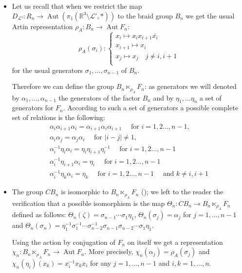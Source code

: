 \documentclass[11pt]{amsart}
\begin{document}
\begin{itemize}
  \item 
  Let us recall that when we restrict the map $D_{\mathcal{L}'}:R_n \to {\mathop{\mathrm{Aut}}\nolimits}(\pi_1({\mathbb{R}}^3 \setminus \mathcal{L}',*))$ to the braid group $B_n$
we get the usual Artin representation $\rho_A : B_n \to {\mathop{\mathrm{Aut}}\nolimits} F_n$:
$$\rho_A(\sigma_i) : 
\left\{\begin{array}{l}
x_i \mapsto x_{i} x_{i+1} {\bar{{x_{i}}}} \\
x_{i+1} \mapsto x_i \\
x_{j} \mapsto x_j \quad j \neq i,i+1\\    
\end{array}\right.
$$
for  the usual generators $\sigma_1, \ldots, \sigma_{n-1}$  of $B_n$.

Therefore we can define the group   $B_n \ltimes_{\rho_A} F_n$:
as generators  we will  denoted by $\alpha_1, \ldots, \alpha_{n-1}$ the generators of the factor
$B_n$ and  by $\eta_1,\ldots \eta_n$ a set  of generators for $F_n$.
According to such a set of generators a possible complete set of relations is the following:
$$
\begin{array}{l}
\alpha_i\alpha_{i+1}\alpha_i = \alpha_{i+1}\alpha_i\alpha_{i+1} \quad \text{ for } i = 1,2\ldots, n-1, \\
\alpha_i\alpha_j=\alpha_j\alpha_i \quad \text{ for } |i-j| \neq 1, \\
\alpha_i^{-1} \eta_i \alpha_i =\eta_{i}\eta_{i+1}\eta_{i}^{-1} \quad \text{ for } i = 1,2\ldots, n-1 \\
\alpha_i^{-1} \eta_{i+1} \alpha_i =\eta_{i} \quad \text{ for } i = 1,2\ldots, n-1 \\
\alpha_i^{-1} \eta_k \alpha_i =\eta_{k}  \quad \text{ for } i = 1,2\ldots, n-1 \quad \text{ and }  k \not= i, i+1
\end{array}
$$

\item The group $CB_n$ is isomorphic to $B_n \ltimes_{\rho_A} F_n$ (\cite{CrP});
we left to the reader the verification that a possible isomorphism is the map
$\Theta_n : CB_n \to B_n \ltimes_{\rho_A} F_n$  defined as follows:
$\Theta_n(\zeta)=\sigma_{n-1} \cdots \sigma_1 \eta_1$, $\Theta_n(\sigma_j)=\alpha_j$ for $j=1, \ldots, n-1$
and $\Theta_n(\sigma_n)= \eta_1^{-1} \sigma_1^{-1} \cdots \sigma_{n-2}^{-1}  \sigma_{n-1} \sigma_{n-2} \cdots \sigma_1 \eta_1$.

Using the action by conjugation of $F_n$ on itself we get 
a representation $\chi_n: B_n \ltimes_{\rho_A} F_n \to {\mathop{\mathrm{Aut}}\nolimits} F_n$. More precisely,
$\chi_n(\alpha_j)=\rho_A(\sigma_j)$ and $\chi_n(\eta_i)(x_k)= x_i^{-1} x_k x_i$
for any $j=1,\ldots, n-1$ and $i,k=1,\ldots, n$.


\end{itemize}
\end{document}
